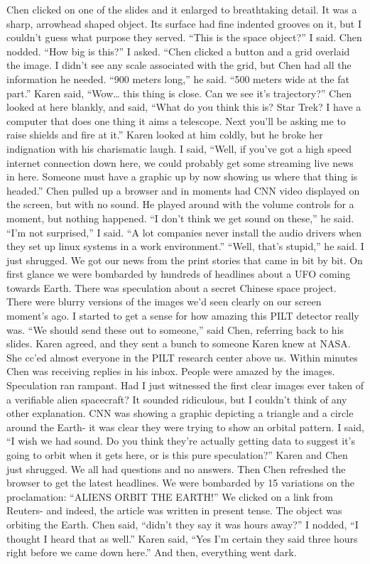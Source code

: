 \documentclass[a4paper]{article}
\begin{document}
Chen clicked on one of the slides and it enlarged to breathtaking detail. It was a sharp, arrowhead shaped object. Its surface had fine indented grooves on it, but I couldn't guess what purpose they served.
“This is the space object?” I said.
Chen nodded.
“How big is this?” I asked.
“Chen clicked a button and a grid overlaid the image. I didn’t see any scale associated with the grid, but Chen had all the information he needed. “900 meters long,” he said. “500 meters wide at the fat part.”
Karen said, “Wow… this thing is close. Can we see it’s trajectory?”
Chen looked at here blankly, and said, “What do you think this is? Star Trek? I have a computer that does one thing it aims a telescope. Next you’ll be asking me to raise shields and fire at it.”
Karen looked at him coldly, but he broke her indignation with his charismatic laugh.
I said, “Well, if you’ve got a high speed internet connection down here, we could probably get some streaming live news in here. Someone must have a graphic up by now showing us where that thing is headed.”
Chen pulled up a browser and in moments had CNN video displayed on the screen, but with no sound. He played around with the volume controls for a moment, but nothing happened. “I don’t think we get sound on these,” he said.
“I’m not surprised,” I said. “A lot companies never install the audio drivers when they set up linux systems in a work environment.”
“Well, that’s stupid,” he said. I just shrugged.
We got our news from the print stories that came in bit by bit. On first glance we were bombarded by hundreds of headlines about a UFO coming towards Earth. There was speculation about a secret Chinese space project. There were blurry versions of the images we’d seen clearly on our screen moment’s ago. I started to get a sense for how amazing this PILT detector really was.
“We should send these out to someone,” said Chen, referring back to his slides. Karen agreed, and they sent a bunch to someone Karen knew at NASA. She cc’ed almost everyone in the PILT research center above us.
Within minutes Chen was receiving replies in his inbox. People were amazed by the images. Speculation ran rampant. Had I just witnessed the first clear images ever taken of a verifiable alien spacecraft? It sounded ridiculous, but I couldn’t think of any other explanation.
CNN was showing a graphic depicting a triangle and a circle around the Earth- it was clear they were trying to show an orbital pattern. I said, “I wish we had sound. Do you think they’re actually getting data to suggest it’s going to orbit when it gets here, or is this pure speculation?”
Karen and Chen just shrugged. We all had questions and no answers.
Then Chen refreshed the browser to get the latest headlines. We were bombarded by 15 variations on the proclamation: “ALIENS ORBIT THE EARTH!”
We clicked on a link from Reuters- and indeed, the article was written in present tense. The object was orbiting the Earth.
Chen said, “didn’t they say it was hours away?”
I nodded, “I thought I heard that as well.”
Karen said, “Yes I’m certain they said three hours right before we came down here.”
And then, everything went dark.
\end{document}
